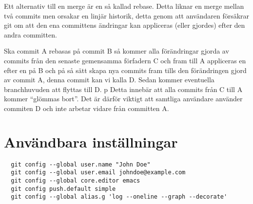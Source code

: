 \documentclass[a4paper,12pt]{article}
\begin{document}
Ett alternativ till en merge är en så kallad rebase.
Detta liknar en merge mellan två commits men orsakar en linjär historik, detta genom att användaren försäkrar git om att den ena committens ändringar kan appliceras (eller gjordes) efter den andra committen.

Ska commit A rebasas på commit B så kommer alla förändringar gjorda av commits från den senaste gemensamma förfadern C och fram till A appliceras en efter en på B och på så sätt skapa nya commits fram tills den förändringen gjord av commit A, denna commit kan vi kalla D.
Sedan kommer eventuella branchhuvuden att flyttas till D.
p
Detta innebär att alla commits från C till A kommer ``glömmas bort''. 
Det är därför viktigt att samtliga användare använder commiten D och inte arbetar vidare från committen A.

\section{Användbara inställningar}

\begin{lstlisting}
  git config --global user.name "John Doe"
  git config --global user.email johndoe@example.com
  git config --global core.editor emacs
  git config push.default simple
  git config --global alias.g 'log --oneline --graph --decorate'
\end{lstlisting}
\end{document}
